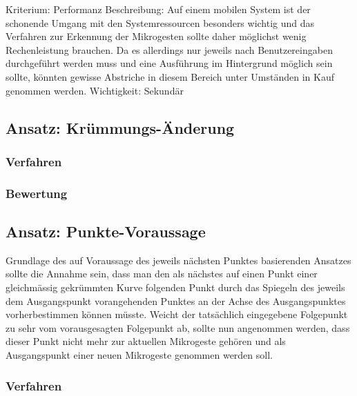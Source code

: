 Kriterium:	Performanz
Beschreibung:	Auf einem mobilen System ist der schonende Umgang mit den Systemressourcen besonders wichtig und das Verfahren zur Erkennung der Mikrogesten sollte daher möglichst wenig Rechenleistung brauchen. Da es allerdings nur jeweils nach Benutzereingaben durchgeführt werden muss und eine Ausführung im Hintergrund möglich sein sollte, könnten gewisse Abstriche in diesem Bereich unter Umständen in Kauf genommen werden.
Wichtigkeit:	Sekundär

\subsection{Ansatz: Krümmungs-Änderung}


\subsubsection{Verfahren}


\subsubsection{Bewertung}


\subsection{Ansatz: Punkte-Voraussage}

Grundlage des auf Voraussage des jeweils nächsten Punktes basierenden Ansatzes sollte die Annahme sein, dass man den als nächstes auf einen Punkt einer gleichmässig gekrümmten Kurve folgenden Punkt durch das Spiegeln des jeweils dem Ausgangspunkt vorangehenden Punktes an der Achse des Ausgangspunktes vorherbestimmen können müsste. Weicht der tatsächlich eingegebene Folgepunkt zu sehr vom vorausgesagten Folgepunkt ab, sollte nun angenommen werden, dass dieser Punkt nicht mehr zur aktuellen Mikrogeste gehören und als Ausgangspunkt einer neuen Mikrogeste genommen werden soll.

\subsubsection{Verfahren}


